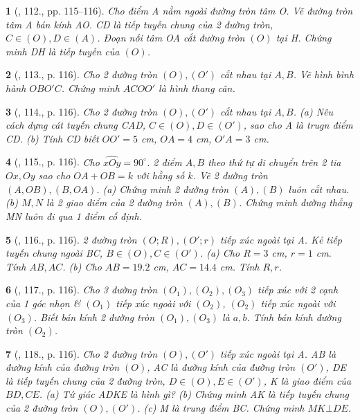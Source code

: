 \documentclass{article}
\newtheorem{baitoan}{}
\begin{document}
\begin{baitoan}[\cite{Binh_Toan_9_tap_1}, 112., pp. 115--116]
	Cho điểm A nằm ngoài đường tròn tâm O. Vẽ đường tròn tâm A bán kính AO. CD là tiếp tuyến chung của 2 đường tròn, $C\in(O),D\in(A)$. Đoạn nối tâm OA cắt đường tròn $(O)$ tại H. Chứng minh DH là tiếp tuyến của $(O)$.
\end{baitoan}

\begin{baitoan}[\cite{Binh_Toan_9_tap_1}, 113., p. 116]
	Cho 2 đường tròn $(O),(O')$ cắt nhau tại $A,B$. Vẽ hình bình hành $OBO'C$. Chứng minh $ACOO'$ là hình thang cân.
\end{baitoan}

\begin{baitoan}[\cite{Binh_Toan_9_tap_1}, 114., p. 116]
	Cho 2 đường tròn $(O),(O')$ cắt nhau tại $A,B$. (a) Nêu cách dựng cát tuyến chung CAD, $C\in(O),D\in(O')$, sao cho A là trugn điểm CD. (b) Tính CD biết $OO' = 5$ {\rm cm}, $OA = 4$ {\rm cm}, $O'A = 3$ {\rm cm}.
\end{baitoan}

\begin{baitoan}[\cite{Binh_Toan_9_tap_1}, 115., p. 116]
	Cho $\widehat{xOy} = 90^\circ$. 2 điểm $A,B$ theo thứ tự di chuyển trên 2 tia $Ox,Oy$ sao cho $OA + OB = k$ với hằng số $k$. Vẽ 2 đường tròn $(A,OB),(B,OA)$. (a) Chứng minh 2 đường tròn $(A),(B)$ luôn cắt nhau. (b) $M,N$ là 2 giao điểm của 2 đường tròn $(A),(B)$. Chứng minh đường thẳng MN luôn đi qua 1 điểm cố định.
\end{baitoan}

\begin{baitoan}[\cite{Binh_Toan_9_tap_1}, 116., p. 116]
	2 đường tròn $(O;R),(O';r)$ tiếp xúc ngoài tại A. Kẻ tiếp tuyến chung ngoài BC, $B\in(O),C\in(O')$. (a) Cho $R = 3$ {\rm cm}, $r = 1$ {\rm cm}. Tính $AB,AC$. (b) Cho $AB = 19.2$ {\rm cm}, $AC = 14.4$ {\rm cm}. Tính $R,r$.
\end{baitoan}

\begin{baitoan}[\cite{Binh_Toan_9_tap_1}, 117., p. 116]
	Cho 3 đường tròn $(O_1),(O_2),(O_3)$ tiếp xúc với 2 cạnh của 1 góc nhọn \& $(O_1)$ tiếp xúc ngoài với $(O_2)$, $(O_2)$ tiếp xúc ngoài với $(O_3)$. Biết bán kính 2 đường tròn $(O_1),(O_3)$ là $a,b$. Tính bán kính đường tròn $(O_2)$.
\end{baitoan}

\begin{baitoan}[\cite{Binh_Toan_9_tap_1}, 118., p. 116]
	Cho 2 đường tròn $(O),(O')$ tiếp xúc ngoài tại A. AB là đường kính của đường tròn $(O)$, AC là đường kính của đường tròn $(O')$, DE là tiếp tuyến chung của 2 đường tròn, $D\in(O),E\in(O')$, K là giao điểm của $BD,CE$. (a) Tứ giác ADKE là hình gì? (b) Chứng minh AK là tiếp tuyến chung của 2 đường tròn $(O),(O')$. (c) M là trung điểm BC. Chứng minh $MK\bot DE$.
\end{baitoan}
\end{document}
